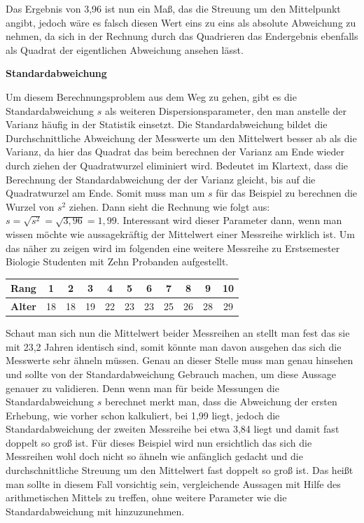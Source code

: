 Das Ergebnis von 3,96 ist nun ein Maß, das die Streuung um den Mittelpunkt angibt, jedoch wäre es falsch diesen Wert eins zu eins als absolute Abweichung zu nehmen, da sich in der Rechnung durch das Quadrieren das Endergebnis ebenfalls als Quadrat der eigentlichen Abweichung ansehen lässt.

\textbf{Standardabweichung}

Um diesem Berechnungsproblem aus dem Weg zu gehen, gibt es die Standardabweichung $s$ als weiteren Dispersionsparameter, den man anstelle der Varianz häufig in der Statistik einsetzt. Die Standardabweichung bildet die Durchschnittliche Abweichung der Messwerte um den Mittelwert besser ab als die Varianz, da hier das Quadrat das beim berechnen der Varianz am Ende wieder durch ziehen der Quadratwurzel eliminiert wird. Bedeutet im Klartext, dass die Berechnung der Standardabweichung der der Varianz gleicht, bis auf die Quadratwurzel am Ende. Somit muss man um $s$ für das Beispiel zu berechnen die Wurzel von $s^2$ ziehen. Dann sieht die Rechnung wie folgt aus: $s = \sqrt{s^2} = \sqrt{3,96} = 1,99$. Interessant wird dieser Parameter dann, wenn man wissen möchte wie aussagekräftig der Mittelwert einer Messreihe wirklich ist. Um das näher zu zeigen wird im folgenden eine weitere Messreihe zu Erstsemester Biologie Studenten mit Zehn Probanden aufgestellt.
\begin{center}
\begin{tabular}{r|c|c|c|c|c|c|c|c|c|c} 
\textbf{Rang} & 1 & 2 & 3 & 4 & 5 & 6 & 7 & 8 & 9 & 10 \\ \hline
\textbf{Alter} & 18 & 18 & 19 & 22 & 23 & 23 & 25 & 26 & 28 & 29\\
\end{tabular}
\end{center}
Schaut man sich nun die Mittelwert beider Messreihen an stellt man fest das sie mit 23,2 Jahren identisch sind, somit könnte man davon ausgehen das sich die Messwerte sehr ähneln müssen. Genau an dieser Stelle muss man genau hinsehen und sollte von der Standardabweichung Gebrauch machen, um diese Aussage genauer zu validieren. Denn wenn man für beide Messungen die Standardabweichung $s$ berechnet merkt man, dass die Abweichung der ersten Erhebung, wie vorher schon kalkuliert, bei 1,99 liegt, jedoch die Standardabweichung der zweiten Messreihe bei etwa 3,84 liegt und damit fast doppelt so groß ist. Für dieses Beispiel wird nun ersichtlich das sich die Messreihen wohl doch nicht so ähneln wie anfänglich gedacht und die durchschnittliche Streuung um den Mittelwert fast doppelt so groß ist. Das heißt man sollte in diesem Fall vorsichtig sein, vergleichende Aussagen mit Hilfe des arithmetischen Mittels zu treffen, ohne weitere Parameter wie die Standardabweichung mit hinzuzunehmen.

